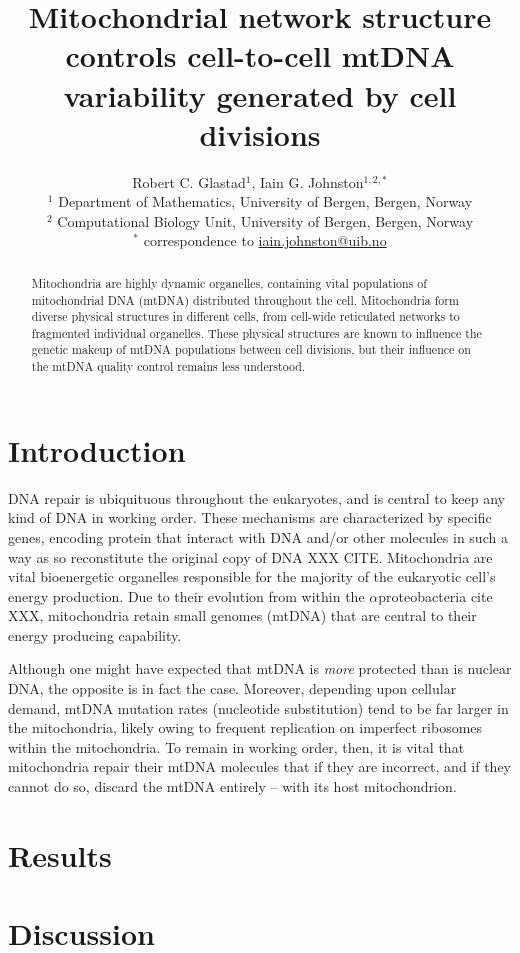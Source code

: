 \documentclass[12pt]{article}
\title{Mitochondrial network structure controls cell-to-cell mtDNA variability generated by cell divisions}
\author{Robert C. Glastad${}^1$, Iain G. Johnston${}^{1,2,*}$ \\ \footnotesize ${}^1$ Department of Mathematics, University of Bergen, Bergen, Norway \\ \footnotesize ${}^2$ Computational Biology Unit, University of Bergen, Bergen, Norway \\ \footnotesize ${}^*$ correspondence to \url{iain.johnston@uib.no}}
\date{}
\begin{document}
\maketitle
\begin{abstract}
Mitochondria are highly dynamic organelles, containing vital populations of mitochondrial DNA (mtDNA) distributed throughout the cell. Mitochondria form diverse physical structures in different cells, from cell-wide reticulated networks to fragmented individual organelles. These physical structures are known to influence the genetic makeup of mtDNA populations between cell divisions, but their influence on the mtDNA quality control remains less understood.
\end{abstract}

\section*{Introduction}
DNA repair is ubiquituous throughout the eukaryotes, and is central to keep any kind of DNA in working order. These mechanisms are characterized by specific genes, encoding protein that interact with DNA and/or other molecules in such a way as so reconstitute the original copy of DNA XXX CITE. Mitochondria are vital bioenergetic organelles responsible for the majority of the eukaryotic cell's energy production. Due to their evolution from within the $\alpha$proteobacteria cite XXX, mitochondria retain small genomes (mtDNA) that are central to their energy producing capability.

Although one might have expected that mtDNA is \textit{more} protected than is nuclear DNA, the opposite is in fact the case. Moreover, depending upon cellular demand, mtDNA mutation rates (nucleotide substitution) tend to be far larger in the mitochondria, likely owing to frequent replication on imperfect ribosomes within the mitochondria. To remain in working order, then, it is vital that mitochondria repair their mtDNA molecules that if they are incorrect, and if they cannot do so, discard the mtDNA entirely -- with its host mitochondrion.


\section*{Results}

\section*{Discussion}
\end{document}
